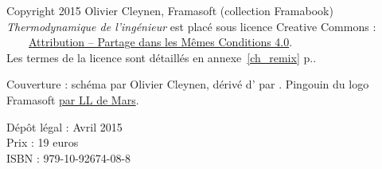 \begin{titlepage}
\begin{center}
		\noindent Copyright 2015 Olivier Cleynen, Framasoft (collection Framabook)\\
		\textit{Thermodynamique de l’ingénieur} est placé sous licence Creative Commons :\\
		\ccLogo\ \ccAttribution\ \ccShareAlike \ \ \href{https://creativecommons.org/licenses/by-sa/4.0/deed.fr}{Attribution -- Partage dans les Mêmes Conditions 4.0}.\\
		Les termes de la licence sont détaillés en annexe~\ref{ch_remix} p.\pageref{ch_remix}.
		
		{\footnotesize Couverture : schéma \ccbysa par Olivier Cleynen, dérivé d’ \ccbysa par . Pingouin du logo Framasoft \lal \href{http://www.le-terrier.net/pingouin/pingouin.html}{par LL de Mars}.\par}

		\noindent Dépôt légal : Avril 2015\\
		Prix : 19 euros\\
		ISBN : 979-10-92674-08-8
\end{center}


\end{titlepage}
\pagestyle{fancy}\restoregeometry

